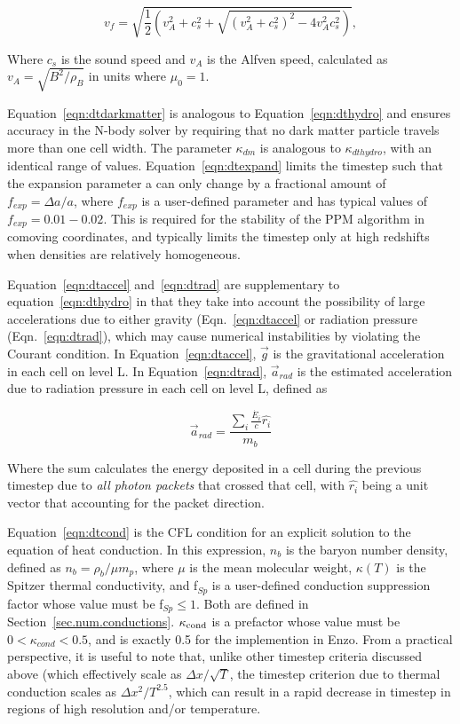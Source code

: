 \begin{equation}
v_f = \sqrt{ \frac{1}{2} \left(  v_A^2 + c_s^2 + \sqrt{(v_A^2 +
      c_s^2)^2 - 4 v_A^2 c_s^2}  \right)  },
\label{eqn:vfastmhd}
\end{equation}

Where $c_s$ is the sound speed and $v_A$ is the Alfven speed, calculated
as $v_A = \sqrt{B^2/\rho_B}$ in units where $\mu_0 = 1$.

Equation~\ref{eqn:dtdarkmatter} is analogous to
Equation~\ref{eqn:dthydro} and ensures accuracy in the N-body solver
by requiring that no dark matter particle travels more than one cell
width.  The parameter $\kappa_{dm}$ is analogous to
$\kappa_{dthydro}$, with an identical range of values.
Equation~\ref{eqn:dtexpand} limits the timestep such that the
expansion parameter a can only change by a fractional amount of
$f_{exp} = \Delta a/a$, where $f_{exp}$ is a user-defined parameter
and has typical values of $f_{exp} = 0.01-0.02$.  This is required for
the stability of the PPM algorithm in comoving coordinates, and
typically limits the timestep only at high redshifts when densities
are relatively homogeneous.

Equation~\ref{eqn:dtaccel} and~\ref{eqn:dtrad} are supplementary to equation~\ref{eqn:dthydro} in that they
take into account the possibility of large accelerations due to either
gravity (Eqn.~\ref{eqn:dtaccel} or radiation pressure
(Eqn.~\ref{eqn:dtrad}), which may cause numerical 
instabilities by violating the Courant condition.  In Equation~\ref{eqn:dtaccel}, $\vec{g}$ is the
gravitational acceleration in each cell on level L.  In
Equation~\ref{eqn:dtrad}, $\vec{a}_{rad}$ is the estimated
acceleration due to radiation pressure in each cell on level L,
defined as

\begin{equation}
\vec{a}_{rad} = \frac{ \sum_i \frac{\dot{E_i}}{c} \hat{r_i} }{m_b} 
\end{equation}

Where the sum calculates the energy deposited in a cell during the
previous timestep due to \textit{all photon packets} that crossed that
cell, with $\hat{r_i}$ being a unit vector that accounting for the
packet direction.

Equation~\ref{eqn:dtcond} is the CFL condition for an explicit
solution to the equation of heat conduction.  In this expression,
$n_b$ is the baryon number density, defined as $n_b = \rho_b / \mu
m_p$, where $\mu$ is the mean molecular weight, $\kappa(T)$ is the
Spitzer thermal conductivity, and f$_{Sp}$ is a user-defined
conduction suppression factor whose value must be f$_{Sp} \leq 1$.  Both are defined in
Section~\ref{sec.num.conductions}.  $\kappa_{\rm cond}$ is a prefactor whose
value must be $0 < \kappa_{cond}  < 0.5$, and is exactly 0.5 for the
implemention in Enzo.
From a practical
perspective, it is useful to note that, unlike other timestep criteria
discussed above (which effectively scale as $\Delta x / \sqrt{T}$,
the timestep criterion due to thermal conduction scales as $\Delta x^2
/ T^{2.5}$, which can result in a rapid decrease in timestep in
regions of high resolution and/or temperature.

